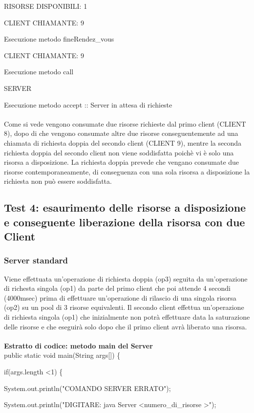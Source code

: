 \documentclass[10pt, a4paper]{article}
\begin{document}
RISORSE DISPONIBILI: 1

CLIENT CHIAMANTE: 9

Esecuzione metodo fineRendez\_vous

CLIENT CHIAMANTE: 9

Esecuzione metodo call

SERVER

Esecuzione metodo accept :: Server in attesa di richieste
\\\\
Come si vede vengono consumate due risorse richieste dal primo client (CLIENT 8), dopo di che vengono consumate altre due risorse conseguentemente ad una chiamata di richiesta doppia del secondo client (CLIENT 9), mentre la seconda richiesta doppia del secondo client non viene soddisfatta poichè vi è solo una risorsa a disposizione. La richiesta doppia prevede che vengano consumate due risorse contemporaneamente, di conseguenza con una sola risorsa a disposizione la richiesta non può essere soddisfatta.
\subsection{Test 4: esaurimento delle risorse a disposizione e conseguente liberazione della risorsa con due Client}
\subsubsection{Server standard}
Viene effettuata un'operazione di richiesta doppia (op3) seguita da un'operazione di richesta singola (op1) da parte del primo client che poi attende 4 secondi (4000msec) prima di effettuare un'operazione di rilascio di una singola risorsa (op2) su un pool di 3 risorse equivalenti. Il secondo client effettua un'operazione di richiesta singola (op1) che inizialmente non potrà effettuare data la saturazione delle risorse e che eseguirà solo dopo che il primo client avrà liberato una risorsa.
\\\\
\textbf{Estratto di codice: metodo main del Server}
\\

public static void main(String args[]) \{

        if(args.length \textless 1) \{

            System.out.println("COMANDO SERVER ERRATO");

            System.out.println("DIGITARE: java Server \textless numero\_di\_risorse \textgreater");
\end{document}
